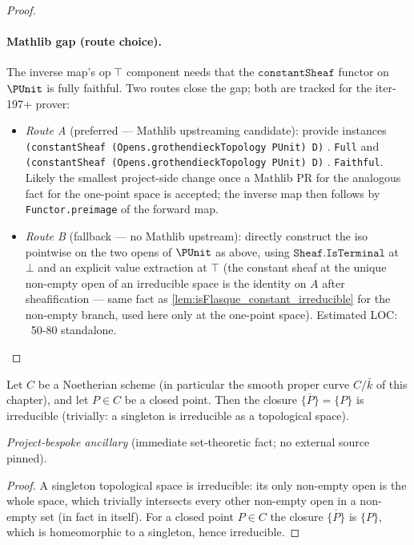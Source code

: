 \begin{proof}
  \paragraph{Mathlib gap (route choice).} The inverse map's
  \(\mathrm{op}\;\top\) component needs that the
  \(\mathtt{constantSheaf}\) functor on \(\PUnit\) is fully faithful.
  Two routes close the gap; both are tracked for the iter-197+
  prover:
  \begin{itemize}
    \item \emph{Route A} (preferred — Mathlib upstreaming
      candidate): provide instances
      \texttt{(constantSheaf (Opens.grothendieckTopology PUnit) D)}
      \(.\) \texttt{Full} and
      \texttt{(constantSheaf (Opens.grothendieckTopology PUnit) D)}
      \(.\) \texttt{Faithful}. Likely the smallest project-side
      change once a Mathlib PR for the analogous fact for the
      one-point space is accepted; the inverse map then follows by
      \texttt{Functor.preimage} of the forward map.
    \item \emph{Route B} (fallback — no Mathlib upstream): directly
      construct the iso pointwise on the two opens of \(\PUnit\) as
      above, using \(\mathtt{Sheaf.IsTerminal}\) at \(\bot\) and an
      explicit value extraction at \(\top\) (the constant sheaf at
      the unique non-empty open of an irreducible space is the
      identity on \(A\) after sheafification — same fact as
      \cref{lem:isFlasque_constant_irreducible} for the non-empty
      branch, used here only at the one-point space). Estimated
      LOC: ~50-80 standalone.
  \end{itemize}
\end{proof}

\begin{lemma}

  \label{lem:closedPoint_closure_irreducible}

  Let \(C\) be a Noetherian scheme (in particular the smooth proper
  curve \(C / \bar k\) of this chapter), and let \(P \in C\) be a closed
  point. Then the closure \(\overline{\{P\}} = \{P\}\) is irreducible
  (trivially: a singleton is irreducible as a topological space).

  \textit{Project-bespoke ancillary} (immediate set-theoretic fact;
  no external source pinned).
\end{lemma}

\begin{proof}


\leanok
  A singleton topological space is irreducible: its only non-empty open
  is the whole space, which trivially intersects every other non-empty
  open in a non-empty set (in fact in itself). For a closed point
  \(P \in C\) the closure \(\overline{\{P\}}\) is \(\{P\}\), which is
  homeomorphic to a singleton, hence irreducible.
\end{proof}

